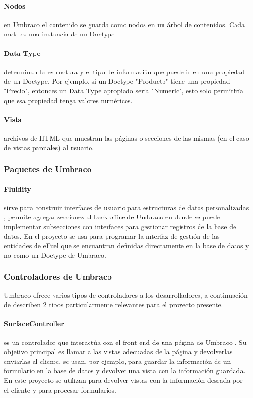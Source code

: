     \paragraph{Nodos} en Umbraco el contenido se guarda como nodos en un árbol de contenidos. Cada nodo es una instancia de un Doctype.
    \paragraph{Data Type} determinan la estructura y el tipo de información que puede ir en una propiedad de un Doctype. Por ejemplo, si un Doctype "Producto" tiene una propiedad "Precio", entonces un Data Type apropiado sería "Numeric", esto solo permitiría que esa propiedad tenga valores numéricos.
    \paragraph{Vista} \label{umbracoView} archivos de HTML que muestran las páginas o secciones de las mismas (en el caso de vistas parciales) al usuario.

    \subsubsection{Paquetes de Umbraco}
    \paragraph{Fluidity} \label{fluidity} sirve para construir interfaces de usuario para estructuras de datos personalizadas \cite{fluidityDocs}, permite agregar secciones al back office de Umbraco en donde se puede implementar subsecciones con interfaces para gestionar registros de la base de datos. En el proyecto se usa para programar la interfaz de gestión de las entidades de eFuel que se encuantran definidas directamente en la base de datos y no como un Doctype de Umbraco.

    \subsubsection{Controladores de Umbraco}
    Umbraco ofrece varios tipos de controladores a los desarrolladores, a continuación de describen 2 tipos particularmente relevantes para el proyecto presente.
    \paragraph{SurfaceController} es un controlador que interactúa con el front end de una página de Umbraco \cite{surfaceController}. Su objetivo principal es llamar a las vistas adecuadas de la página y devolverlas enviarlas al cliente, se usan, por ejemplo, para guardar la información de un formulario en la base de datos y devolver una vista con la información guardada. En este proyecto se utilizan para devolver vistas con la información deseada por el cliente y para procesar formularios.
